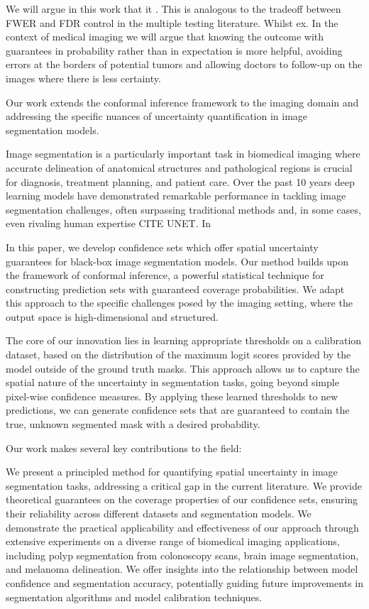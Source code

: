 We will argue in this work that it . This is analogous to the tradeoff between FWER and FDR control in the multiple testing literature. Whilst ex. In the context of medical imaging we will argue that knowing the outcome with guarantees in probability rather than in expectation is more helpful, avoiding errors at the borders of potential tumors and allowing doctors to follow-up on the images where there is less certainty.


Our work extends the conformal inference framework to the imaging domain and addressing the specific nuances of uncertainty quantification in image segmentation models.

Image segmentation is a particularly important task in biomedical imaging where accurate delineation of anatomical structures and pathological regions is crucial for diagnosis, treatment planning, and patient care. Over the past 10 years deep learning models have demonstrated remarkable performance in tackling image segmentation challenges, often surpassing traditional methods and, in some cases, even rivaling human expertise CITE UNET. In 


In this paper, we develop confidence sets which offer spatial uncertainty guarantees for black-box image segmentation models. Our method builds upon the framework of conformal inference, a powerful statistical technique for constructing prediction sets with guaranteed coverage probabilities. We adapt this approach to the specific challenges posed by the imaging setting, where the output space is high-dimensional and structured.


The core of our innovation lies in learning appropriate thresholds on a calibration dataset, based on the distribution of the maximum logit scores provided by the model outside of the ground truth masks. This approach allows us to capture the spatial nature of the uncertainty in segmentation tasks, going beyond simple pixel-wise confidence measures. By applying these learned thresholds to new predictions, we can generate confidence sets that are guaranteed to contain the true, unknown segmented mask with a desired probability.

Our work makes several key contributions to the field:

We present a principled method for quantifying spatial uncertainty in image segmentation tasks, addressing a critical gap in the current literature.
We provide theoretical guarantees on the coverage properties of our confidence sets, ensuring their reliability across different datasets and segmentation models.
We demonstrate the practical applicability and effectiveness of our approach through extensive experiments on a diverse range of biomedical imaging applications, including polyp segmentation from colonoscopy scans, brain image segmentation, and melanoma delineation.
We offer insights into the relationship between model confidence and segmentation accuracy, potentially guiding future improvements in segmentation algorithms and model calibration techniques.


